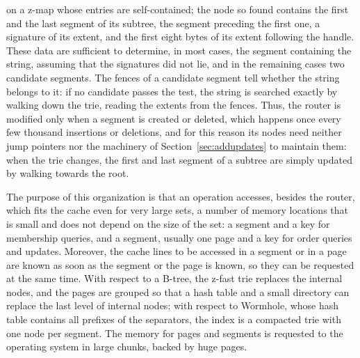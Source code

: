 \documentclass[a4paper]{article}
\newcommand{\?}{\mskip1.5mu}
\begin{document}
\begin{itemize}
on a z-map whose entries are self-contained; the node so found contains the first and the last segment of its subtree, the segment preceding the first one, 
a signature of its extent, and the first eight bytes of its extent following the handle. These data are sufficient to determine, 
in most cases, the segment containing the string, assuming that the signatures did not lie, and in the remaining cases two candidate segments. 
The fences of a candidate segment tell whether the string belongs to it: if no candidate passes the test, the string is searched exactly by walking down the trie, 
reading the extents from the fences. Thus, the router is modified only when a segment is created or deleted, which happens once every few thousand insertions or deletions,
and for this reason its nodes need neither jump pointers nor the machinery of Section~\ref{sec:addupdates} to maintain them: when the trie changes, 
the first and last segment of a subtree are simply updated by walking towards the root.
\end{itemize}
The purpose of this organization is that an operation accesses, besides the router, which fits the cache even for very large sets, 
a number of memory locations that is small and does not depend on the size of the set: a segment and a key for membership queries, 
and a segment, usually one page and a key for order queries and updates. Moreover, the cache lines to be accessed in a segment or in a page
are known as soon as the segment or the page is known, so they can be requested at the same time. With respect to a B-tree, 
the z-fast trie replaces the internal nodes, and the pages are grouped so that a hash table and a small directory can replace the last level of internal nodes; 
with respect to Wormhole, whose hash table contains all prefixes of the separators, the index is a compacted trie with one node per segment.
The memory for pages and segments is requested to the operating system in large chunks, backed by huge pages.
\end{document}
